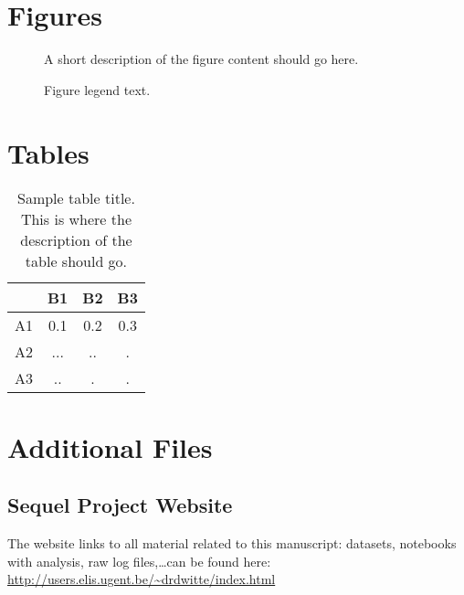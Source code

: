 \documentclass[twocolumn]{bmcart}%
\begin{document}
\begin{backmatter}

\section*{Figures}
  \begin{figure}[ht!]
  \caption{
      A short description of the figure content
      should go here.}
      \end{figure}

\begin{figure}[ht!]
  \caption{
      Figure legend text.}
      \end{figure}


\section*{Tables}
\begin{table}[h!]
\caption{Sample table title. This is where the description of the table should go.}
      \begin{tabular}{cccc}
        \hline
           & B1  &B2   & B3\\ \hline
        A1 & 0.1 & 0.2 & 0.3\\
        A2 & ... & ..  & .\\
        A3 & ..  & .   & .\\ \hline
      \end{tabular}
\end{table}


\section*{Additional Files}
  \subsection*{Sequel Project Website}
    The website links to all material related to this manuscript: datasets, notebooks with analysis, raw log files,\ldots can be found here: \url{http://users.elis.ugent.be/~drdwitte/index.html}


\end{backmatter}
\end{document}
